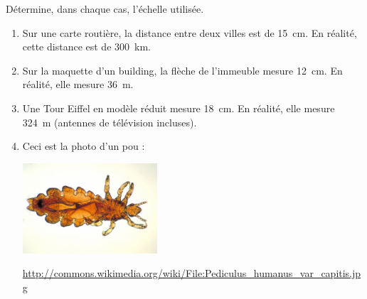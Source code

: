 
\begin{exercice}\label{exo2smath-0126}

Détermine, dans chaque cas, l'échelle utilisée.
\begin{enumerate}
    \item
 Sur une carte routière, la distance entre deux villes est de \SI{15}{\centi\meter}. En réalité, cette distance est de \SI{300}{\kilo\meter}.
\item
    Sur la maquette d’un building, la flèche de l'immeuble mesure \SI{12}{\centi\meter}. En réalité, elle mesure \SI{36}{\meter}.
\item
    Une Tour Eiffel en modèle réduit mesure \SI{18}{\centi\meter}. En réalité, elle mesure \SI{324}{\meter} (antennes de télévision incluses).
\item
Ceci est la photo d'un pou :
    \begin{center}
 \includegraphics[width=5cm]{Pediculus_humanus.pdf}
    \end{center}
    {\tiny \url{http://commons.wikimedia.org/wiki/File:Pediculus_humanus_var_capitis.jpg}}

\end{enumerate}

\end{exercice}
